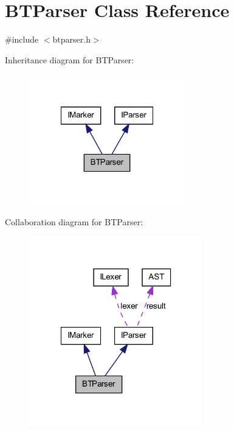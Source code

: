 \hypertarget{class_b_t_parser}{
\section{BTParser Class Reference}
\label{class_b_t_parser}
}


{\ttfamily \#include $<$btparser.h$>$}



Inheritance diagram for BTParser:
\nopagebreak
\begin{figure}[H]
\begin{center}
\leavevmode
\includegraphics[width=192pt]{class_b_t_parser__inherit__graph}
\end{center}
\end{figure}


Collaboration diagram for BTParser:
\nopagebreak
\begin{figure}[H]
\begin{center}
\leavevmode
\includegraphics[width=214pt]{class_b_t_parser__coll__graph}
\end{center}
\end{figure}
